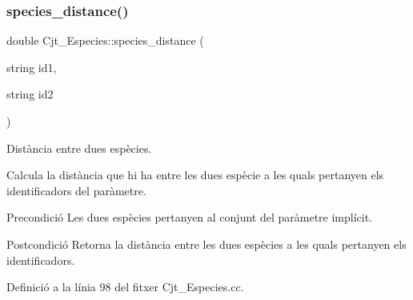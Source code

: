 \subsubsection{\texorpdfstring{species\+\_\+distance()}{species\_distance()}}
{\footnotesize\ttfamily double Cjt\+\_\+\+Especies\+::species\+\_\+distance (\begin{DoxyParamCaption}\item[{string}]{id1,  }\item[{string}]{id2 }\end{DoxyParamCaption})}



Distància entre dues espècies. 

Calcula la distància que hi ha entre les dues espècie a les quals pertanyen els identificadors del paràmetre.

\begin{DoxyPrecond}{Precondició}
Les dues espècies pertanyen al conjunt del paràmetre implícit. 
\end{DoxyPrecond}
\begin{DoxyPostcond}{Postcondició}
Retorna la distància entre les dues espècies a les quals pertanyen els identificadors. 
\end{DoxyPostcond}


Definició a la línia 98 del fitxer Cjt\+\_\+\+Especies.\+cc.


